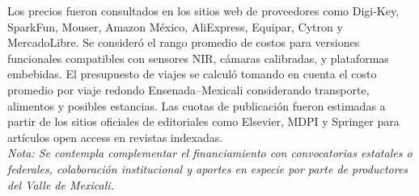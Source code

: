 Los precios fueron consultados en los sitios web de proveedores como Digi-Key, SparkFun, Mouser, Amazon México, AliExpress, Equipar, Cytron y MercadoLibre. Se consideró el rango promedio de costos para versiones funcionales compatibles con sensores NIR, cámaras calibradas, y plataformas embebidas. El presupuesto de viajes se calculó tomando en cuenta el costo promedio por viaje redondo Ensenada–Mexicali considerando transporte, alimentos y posibles estancias. Las cuotas de publicación fueron estimadas a partir de los sitios oficiales de editoriales como Elsevier, MDPI y Springer para artículos open access en revistas indexadas.\\

\textit{Nota: Se contempla complementar el financiamiento con convocatorias estatales o federales, colaboración institucional y aportes en especie por parte de productores del Valle de Mexicali.}